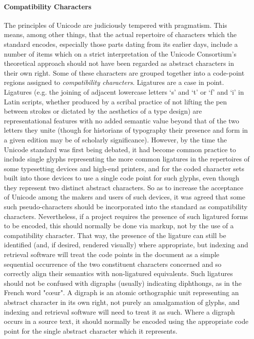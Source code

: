 \paragraph[{Compatibility Characters}]{Compatibility Characters}\label{D4-46-1}\par
The principles of Unicode are judiciously tempered with pragmatism. This means, among other things, that the actual repertoire of characters which the standard encodes, especially those parts dating from its earlier days, include a number of items which on a strict interpretation of the Unicode Consortium's theoretical approach should not have been regarded as abstract characters in their own right. Some of these characters are grouped together into a code-point regions assigned to \textit{compatibility characters}. Ligatures are a case in point. Ligatures (e.g. the joining of adjacent lowercase letters ‘s’ and ‘t’ or ‘f’ and ‘i’ in Latin scripts, whether produced by a scribal practice of not lifting the pen between strokes or dictated by the aesthetics of a type design) are representational features with no added semantic value beyond that of the two letters they unite (though for historians of typography their presence and form in a given edition may be of scholarly significance). However, by the time the Unicode standard was first being debated, it had become common practice to include single glyphs representing the more common ligatures in the repertoires of some typesetting devices and high-end printers, and for the coded character sets built into those devices to use a single code point for such glyphs, even though they represent two distinct abstract characters. So as to increase the acceptance of Unicode among the makers and users of such devices, it was agreed that some such pseudo-characters should be incorporated into the standard as compatibility characters. Nevertheless, if a project requires the presence of such ligatured forms to be encoded, this should normally be done via markup, not by the use of a compatibility character. That way, the presence of the ligature can still be identified (and, if desired, rendered visually) where appropriate, but indexing and retrieval software will treat the code points in the document as a simple sequential occurrence of the two constituent characters concerned and so correctly align their semantics with non-ligatured equivalents. Such ligatures should not be confused with digraphs (usually) indicating diphthongs, as in the French word "cœur". A digraph is an atomic orthographic unit representing an abstract character in its own right, not purely an amalgamation of glyphs, and indexing and retrieval software will need to treat it as such. Where a digraph occurs in a source text, it should normally be encoded using the appropriate code point for the single abstract character which it represents.
